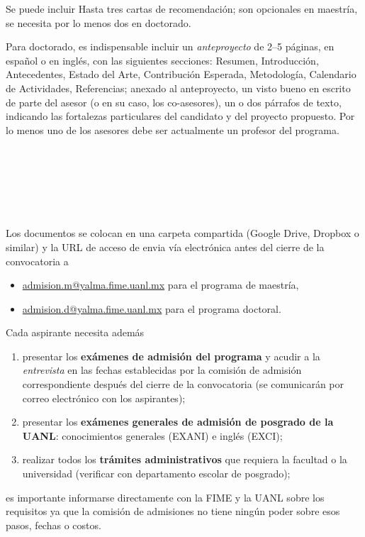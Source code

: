 \documentclass{article}
\begin{document}
\begin{Form}
Se puede incluir Hasta tres cartas de recomendación; son opcionales en
maestría, se necesita por lo menos dos en doctorado.

Para doctorado, es indispensable incluir un {\em anteproyecto} de 2--5
páginas, en español o en inglés, con las siguientes secciones:
Resumen, Introducción, Antecedentes, Estado del Arte, Contribución
Esperada, Metodología, Calendario de Actividades, Referencias; anexado
al anteproyecto, un visto bueno en escrito de parte del asesor (o en
su caso, los co-asesores), un o dos párrafos de texto, indicando las
fortalezas particulares del candidato y del proyecto propuesto. Por lo
menos uno de los asesores debe ser actualmente un profesor del
programa.

\begin{flushright}
 \\
 \\
 \\
 \\
 \\
\end{flushright}

Los documentos se colocan en una carpeta compartida (Google Drive,
Dropbox o similar) y la URL de acceso de envia vía electrónica antes
del cierre de la convocatoria a
\begin{itemize}
\item \url{admision.m@yalma.fime.uanl.mx} para el programa de maestría,
\item \url{admision.d@yalma.fime.uanl.mx} para el programa doctoral.
\end{itemize}

Cada aspirante necesita además
\begin{enumerate}
\item presentar los {\bf exámenes de admisión del programa} y acudir a la
  {\em entrevista} en las fechas establecidas por la comisión de admisión
  correspondiente después del cierre de la convocatoria (se
  comunicarán por correo electrónico con los aspirantes);
\item presentar los {\bf exámenes generales de admisión de posgrado de la
  UANL}: conocimientos generales (EXANI) e inglés (EXCI);
\item realizar todos los {\bf trámites administrativos} que requiera la facultad o
  la universidad  (verificar con departamento escolar de posgrado);
\end{enumerate}
es importante informarse directamente con la FIME y la UANL sobre los
requisitos ya que la comisión de admisiones no tiene ningún poder
sobre esos pasos, fechas o costos.



  


\end{Form}
\end{document}
